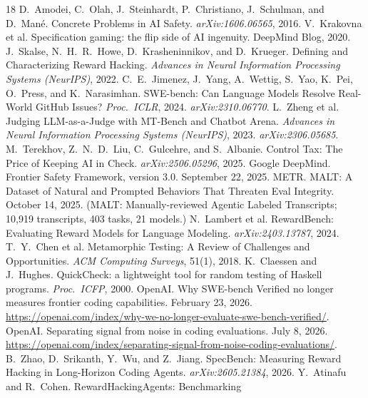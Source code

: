 \documentclass[11pt]{article}
\begin{document}
\begin{thebibliography}{18}
\scriptsize
\setlength{\itemsep}{0pt}
\setlength{\parsep}{0pt}
 D.~Amodei, C.~Olah, J.~Steinhardt, P.~Christiano, J.~Schulman, and D.~Man\'e.
Concrete Problems in AI Safety. \emph{arXiv:1606.06565}, 2016.
 V.~Krakovna et al. Specification gaming: the flip side of AI ingenuity.
DeepMind Blog, 2020.
 J.~Skalse, N.~H.~R.~Howe, D.~Krasheninnikov, and D.~Krueger. Defining and
Characterizing Reward Hacking. \emph{Advances in Neural Information Processing Systems (NeurIPS)}, 2022.
 C.~E.~Jimenez, J.~Yang, A.~Wettig, S.~Yao, K.~Pei, O.~Press, and
K.~Narasimhan. SWE-bench: Can Language Models Resolve Real-World GitHub Issues? \emph{Proc.\ ICLR}, 2024.
\emph{arXiv:2310.06770}.
 L.~Zheng et al. Judging LLM-as-a-Judge with MT-Bench and Chatbot Arena.
\emph{Advances in Neural Information Processing Systems (NeurIPS)}, 2023. \emph{arXiv:2306.05685}.
 M.~Terekhov, Z.~N.~D.~Liu, C.~Gulcehre, and S.~Albanie. Control Tax: The
Price of Keeping AI in Check. \emph{arXiv:2506.05296}, 2025.
 Google DeepMind. Frontier Safety Framework, version 3.0. September 22, 2025.
 METR. MALT: A Dataset of Natural and Prompted Behaviors That Threaten Eval
Integrity. October 14, 2025. (MALT: Manually-reviewed Agentic Labeled Transcripts; 10{,}919 transcripts,
403 tasks, 21 models.)
 N.~Lambert et al. RewardBench: Evaluating Reward Models for Language
Modeling. \emph{arXiv:2403.13787}, 2024.
 T.~Y.~Chen et al. Metamorphic Testing: A Review of Challenges and
Opportunities. \emph{ACM Computing Surveys}, 51(1), 2018.
 K.~Claessen and J.~Hughes. QuickCheck: a lightweight tool for random
testing of Haskell programs. \emph{Proc.\ ICFP}, 2000.
 OpenAI. Why SWE-bench Verified no longer measures frontier coding
capabilities. February 23, 2026. \url{https://openai.com/index/why-we-no-longer-evaluate-swe-bench-verified/}.
 OpenAI. Separating signal from noise in coding evaluations. July 8, 2026.
\url{https://openai.com/index/separating-signal-from-noise-coding-evaluations/}.
 B.~Zhao, D.~Srikanth, Y.~Wu, and Z.~Jiang. SpecBench: Measuring Reward Hacking
in Long-Horizon Coding Agents. \emph{arXiv:2605.21384}, 2026.
 Y.~Atinafu and R.~Cohen. RewardHackingAgents: Benchmarking

\end{thebibliography}
\end{document}
